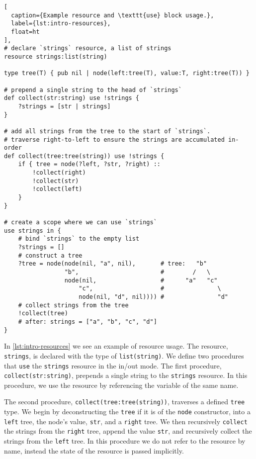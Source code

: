 \begin{lstlisting}[
  caption={Example resource and \texttt{use} block usage.},
  label={lst:intro-resources},
  float=ht
],
# declare `strings` resource, a list of strings
resource strings:list(string)

type tree(T) { pub nil | node(left:tree(T), value:T, right:tree(T)) }

# prepend a single string to the head of `strings`
def collect(str:string) use !strings {
    ?strings = [str | strings]
}

# add all strings from the tree to the start of `strings`.
# traverse right-to-left to ensure the strings are accumulated in-order
def collect(tree:tree(string)) use !strings {
    if { tree = node(?left, ?str, ?right) :: 
        !collect(right)
        !collect(str)
        !collect(left)
    }
}

# create a scope where we can use `strings`
use strings in {
    # bind `strings` to the empty list
    ?strings = []
    # construct a tree
    ?tree = node(node(nil, "a", nil),       # tree:   "b"
                 "b",                       #        /   \
                 node(nil,                  #      "a"   "c"
                     "c",                   #               \
                     node(nil, "d", nil)))) #               "d"
    # collect strings from the tree
    !collect(tree)
    # after: strings = ["a", "b", "c", "d"]
}
\end{lstlisting}

In \cref{lst:intro-resources} we see an example of resource usage. The resource, \texttt{strings}, is declared with the type of \texttt{list(string)}. We define two procedures that \texttt{use} the \texttt{strings} resource in the in/out mode. The first procedure, \texttt{collect(str:string)}, prepends a single string to the \texttt{strings} resource. In this procedure, we use the resource by referencing the variable of the same name.

The second procedure, \texttt{collect(tree:tree(string))}, traverses a defined \texttt{tree} type. We begin by deconstructing the \texttt{tree} if it is of the \texttt{node} constructor, into a \texttt{left} tree, the node's value, \texttt{str}, and a \texttt{right} tree. We then recursively \texttt{collect} the strings from the \texttt{right} tree, append the value \texttt{str}, and recursively collect the strings from the \texttt{left} tree. In this procedure we do not refer to the resource by name, instead the state of the resource is passed implicitly.

